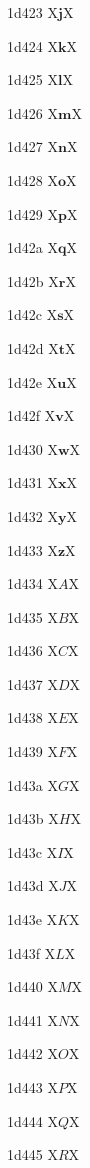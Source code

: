 \documentclass[11pt]{article}
\begin{document}
1d423 X{\ensuremath{\mathbf{j}}}X

1d424 X{\ensuremath{\mathbf{k}}}X

1d425 X{\ensuremath{\mathbf{l}}}X

1d426 X{\ensuremath{\mathbf{m}}}X

1d427 X{\ensuremath{\mathbf{n}}}X

1d428 X{\ensuremath{\mathbf{o}}}X

1d429 X{\ensuremath{\mathbf{p}}}X

1d42a X{\ensuremath{\mathbf{q}}}X

1d42b X{\ensuremath{\mathbf{r}}}X

1d42c X{\ensuremath{\mathbf{s}}}X

1d42d X{\ensuremath{\mathbf{t}}}X

1d42e X{\ensuremath{\mathbf{u}}}X

1d42f X{\ensuremath{\mathbf{v}}}X

1d430 X{\ensuremath{\mathbf{w}}}X

1d431 X{\ensuremath{\mathbf{x}}}X

1d432 X{\ensuremath{\mathbf{y}}}X

1d433 X{\ensuremath{\mathbf{z}}}X

1d434 X{\ensuremath{\mathit{A}}}X

1d435 X{\ensuremath{\mathit{B}}}X

1d436 X{\ensuremath{\mathit{C}}}X

1d437 X{\ensuremath{\mathit{D}}}X

1d438 X{\ensuremath{\mathit{E}}}X

1d439 X{\ensuremath{\mathit{F}}}X

1d43a X{\ensuremath{\mathit{G}}}X

1d43b X{\ensuremath{\mathit{H}}}X

1d43c X{\ensuremath{\mathit{I}}}X

1d43d X{\ensuremath{\mathit{J}}}X

1d43e X{\ensuremath{\mathit{K}}}X

1d43f X{\ensuremath{\mathit{L}}}X

1d440 X{\ensuremath{\mathit{M}}}X

1d441 X{\ensuremath{\mathit{N}}}X

1d442 X{\ensuremath{\mathit{O}}}X

1d443 X{\ensuremath{\mathit{P}}}X

1d444 X{\ensuremath{\mathit{Q}}}X

1d445 X{\ensuremath{\mathit{R}}}X
\end{document}
